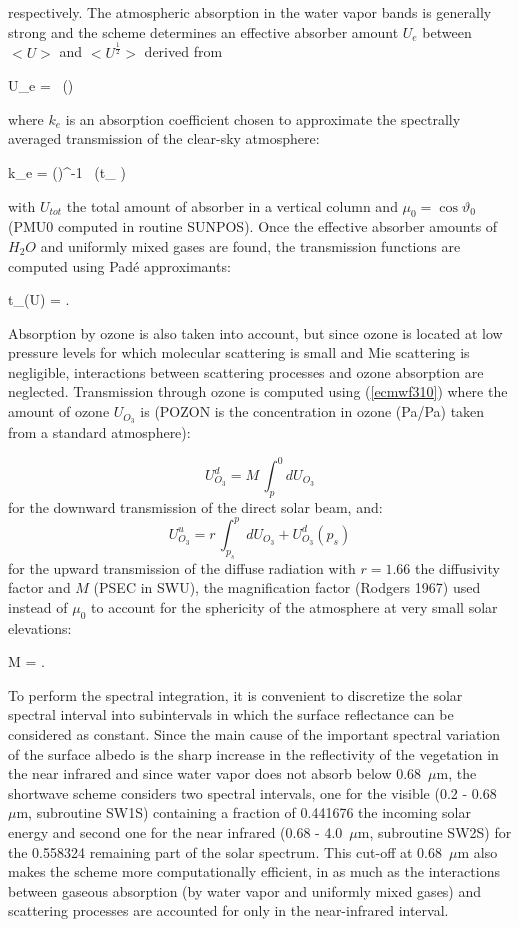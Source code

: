 \noindent respectively. The atmospheric absorption in the water vapor bands is generally strong and the
scheme determines an effective absorber amount $U_e$ between $<U>$ and
$<U^{\frac{1}{2}}>$ derived from

\medskip
\be
U_e =  \, \ln()
\label{ecmwf38}
\ee
\medskip

\noindent where $k_e$ is an absorption coefficient chosen to approximate the spectrally averaged transmission of the clear-sky atmosphere:

\medskip
\be
k_e = ()^{-1} \, \ln(t_{\Delta\nu} )
\label{ecmwf39}
\ee
\medskip

\noindent with $U_{tot}$ the total amount of absorber in a vertical column and
$\mu_0 =\cos\vartheta _0$ (PMU0 computed in routine SUNPOS). Once the effective
absorber amounts of $H_{2}O$ and uniformly mixed gases are found, the
transmission functions are computed using Pad\'e approximants:

\medskip
\be
t_{\Delta\nu}(U) = .
\label{ecmwf310}
\ee
\medskip

Absorption by ozone is also taken into account, but since ozone is located at
low pressure levels for which molecular scattering is small and Mie scattering
is negligible, interactions between scattering processes and ozone absorption
are neglected. Transmission through ozone is computed using (\ref{ecmwf310})
where the amount of ozone $U_{O_3}$ is (POZON is the concentration in ozone
(Pa/Pa) taken from a standard atmosphere):

%
\medskip
\[
U_{O_3}^d = M \, \int_{p}^{0}{dU_{O_3}}
\]
for the downward transmission of the direct solar beam, and:
\[
U_{O_3}^u = r \, \int_{p_s}^{p}{dU_{O_3}} + U_{O_3}^d(p_s)
\]
for the upward transmission of the diffuse radiation with $r = 1.66$ the
diffusivity factor and $M$ (PSEC in SWU), the magnification factor
(Rodgers 1967) used instead of $\mu_0$ to account for the sphericity of the
atmosphere at very small solar elevations:

\medskip
\be
M = .
\label{ecmwf311}
\ee
\medskip

To perform the spectral integration, it is convenient to discretize the solar
spectral interval into subintervals in which the surface reflectance can be
considered as constant. Since the main cause of the important spectral variation
of the surface albedo is the sharp increase in the reflectivity of the
vegetation in the near infrared and since water vapor does not absorb below
0.68~$\mu$m, the shortwave scheme considers two spectral intervals, one for the
visible (0.2 - 0.68~$\mu$m, subroutine SW1S) containing a fraction of 0.441676
the incoming solar energy and second one for the near infrared
(0.68 - 4.0~$\mu$m, subroutine SW2S) for the 0.558324 remaining part of the
solar spectrum. This cut-off at 0.68~$\mu$m also makes the scheme more
computationally efficient, in as much as the interactions between gaseous
absorption (by water vapor and uniformly mixed gases) and scattering processes
are accounted for only in the near-infrared interval.

